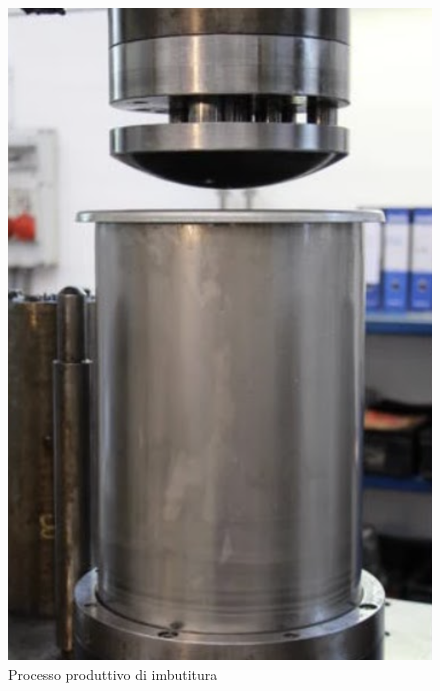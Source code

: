 \begin{figure}[h]
    \includegraphics[scale=0.2]{Immagini/Imbutitura2.png}
    \caption{Processo produttivo di imbutitura}
    \label{fig:Imbutitura}
\end{figure}
